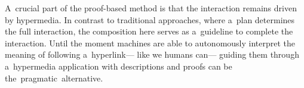 
A~crucial part of the proof-based method is that the interaction remains driven by hypermedia.
In contrast to traditional approaches,
where a~plan determines the full interaction,
the composition here serves as a~guideline to complete the interaction.
Until the moment machines are able to autonomously interpret
the meaning of following a~hyperlink---%
like we humans can---%
guiding them through a~hypermedia application with descriptions and proofs
can be the~pragmatic~alternative.

